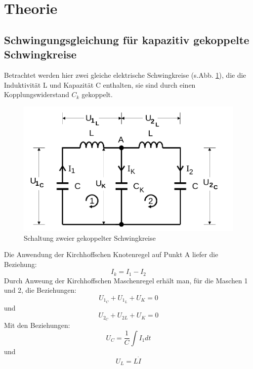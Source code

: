 \section{Theorie}
\label{sec:Theorie}


\subsection{Schwingungsgleichung für kapazitiv gekoppelte Schwingkreise}
Betrachtet werden hier zwei gleiche elektrische Schwingkreise (s.Abb. \ref{fig:Abb2}), die die Induktivität L und Kapazität C enthalten,
sie sind durch einen Kopplungswiderstand $ C_k$ gekoppelt.
\begin{figure}
  \centering
  \includegraphics[width=\textwidth]{./logos/Abb2.png}
  \caption{Schaltung zweier gekoppelter Schwingkreise}
  \label{fig:Abb2}
\end{figure}
Die Anwendung der Kirchhoffschen Knotenregel auf Punkt A liefer die Beziehung:
\begin{equation}
 I_k = I_1 - I_2
 \label{eqn:KK}
\end{equation}
Durch Anweung der Kirchhoffschen Maschenregel erhält man, für die Maschen 1 und 2, die Beziehungen:
\begin{equation}
  U_{1_{C}} + U_{1_{L}} + U_K = 0
  \label{eqn:KM1}
\end{equation}
 und
 \begin{equation}
   U_{2_{C}} + U_{2{L}} + U_K = 0
   \label{eqn:KM2}
 \end{equation}
 Mit den Beziehungen:
 \begin{equation*}
   U_C = \frac{1}{C} \int I_1 dt
 \end{equation*}
 und
 \begin{equation*}
   U_L = L\dot{I}
\end{equation*}
